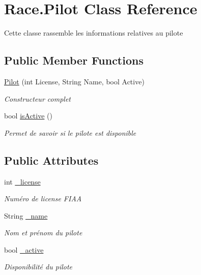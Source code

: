 \hypertarget{class_race_1_1_pilot}{}\section{Race.\+Pilot Class Reference}
\label{class_race_1_1_pilot}


Cette classe rassemble les informations relatives au pilote  


\subsection*{Public Member Functions}
\begin{DoxyCompactItemize}
\item 
\hyperlink{class_race_1_1_pilot_a9d16e04906038dc2fa44f7669b4b6111}{Pilot} (int License, String Name, bool Active)
\begin{DoxyCompactList}\small\item\em Constructeur complet \end{DoxyCompactList}\item 
bool \hyperlink{class_race_1_1_pilot_aa51e8cfea56087c6b17e55f5338883b4}{is\+Active} ()
\begin{DoxyCompactList}\small\item\em Permet de savoir si le pilote est disponible \end{DoxyCompactList}\end{DoxyCompactItemize}
\subsection*{Public Attributes}
\begin{DoxyCompactItemize}
\item 
int \hyperlink{class_race_1_1_pilot_a4587e5f43f5ea68ad850831dfbdf7f5d}{\+\_\+license}
\begin{DoxyCompactList}\small\item\em Numéro de license F\+I\+A\+A \end{DoxyCompactList}\item 
String \hyperlink{class_race_1_1_pilot_a10981c1bc4f92cb9b1610f3059abb50b}{\+\_\+name}
\begin{DoxyCompactList}\small\item\em Nom et prénom du pilote \end{DoxyCompactList}\item 
bool \hyperlink{class_race_1_1_pilot_acb1cd4a31a0d46668c8b579ae0b21c26}{\+\_\+active}
\begin{DoxyCompactList}\small\item\em Disponibilité du pilote \end{DoxyCompactList}\end{DoxyCompactItemize}


